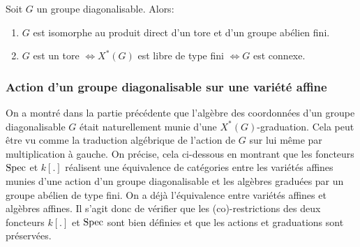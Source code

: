 \begin{cor}
Soit $G$ un groupe diagonalisable. Alors:
\begin{enumerate}
\item $G$ est isomorphe au produit direct d'un tore et d'un groupe abélien fini.
\item $G$ est un tore $\iff X^*(G)$ est libre de type fini $\iff G$ est connexe.
\end{enumerate}
\end{cor}



\subsubsection{Action d'un groupe diagonalisable sur une variété affine}

On a montré dans la partie précédente que l'algèbre des coordonnées d'un groupe diagonalisable $G$ était naturellement munie d'une $X^*(G)$-graduation. Cela peut être vu comme la traduction algébrique de l'action de $G$ sur lui même par multiplication à gauche. On précise, cela ci-dessous en montrant que les foncteurs $\operatorname{Spec}$ et $k[.]$ réalisent une équivalence de catégories entre les variétés affines munies d'une action d'un groupe diagonalisable et les algèbres graduées par un groupe abélien de type fini. On a déjà l'équivalence entre variétés affines et algèbres affines. Il s'agit donc de vérifier que les (co)-restrictions des deux foncteurs $k[.]$ et $\operatorname{Spec}$ sont bien définies et que les actions et graduations sont préservées.


